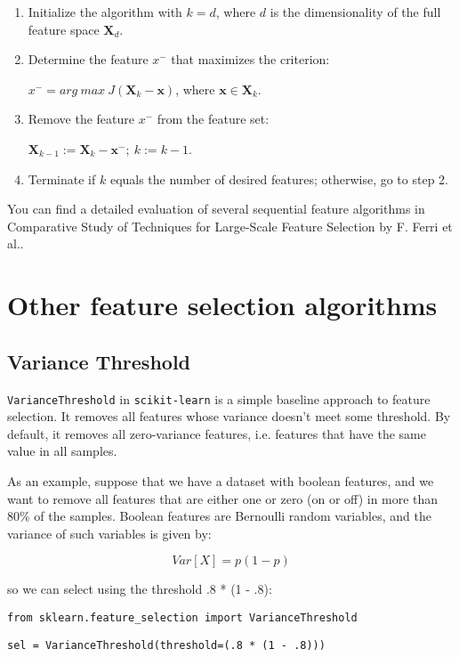 \documentclass[11pt]{article}
\begin{document}
    \begin{enumerate}
        \item Initialize the algorithm with $k=d$, where $d$ is the dimensionality of the full feature space $\boldsymbol{X}_d$.
        \item Determine the feature $x^-$ that maximizes the criterion:

        $x^-=arg~max~J(\boldsymbol{X}_k - \boldsymbol{x})$, where $\boldsymbol{x}\in \boldsymbol{X}_k$.

        \item Remove the feature $x^-$ from the feature set:

        $\boldsymbol{X}_{k-1}:=\boldsymbol{X}_k - \boldsymbol{x}^-;~k:=k-1$.

        \item Terminate if $k$ equals the number of desired features;
        otherwise, go to step 2.
    \end{enumerate}

    You can find a detailed evaluation of several sequential feature algorithms in Comparative Study of Techniques for Large-Scale Feature Selection by F. Ferri et al.\cite{Ferri1994}.

    \section{Other feature selection algorithms} \label{sec:other_feature_selection_algorithms}

    \subsection{Variance Threshold} \label{subsec:variance_threshold}

    \texttt{VarianceThreshold} in \texttt{scikit-learn} is a simple baseline approach to feature selection.
    It removes all features whose variance doesn’t meet some threshold.
    By default, it removes all zero-variance features, i.e. features that have the same value in all samples.

    As an example, suppose that we have a dataset with boolean features, and we want to remove all features that are either one or zero (on or off) in more than 80\% of the samples.
    Boolean features are Bernoulli random variables, and the variance of such variables is given by:

    \begin{equation} \label{eq:bernoulli_variance}
        Var[X] = p(1-p)
    \end{equation}

    so we can select using the threshold .8 * (1 - .8):

    \texttt{from sklearn.feature\_selection import VarianceThreshold}

    \texttt{sel = VarianceThreshold(threshold=(.8 * (1 - .8)))}


    
    
\end{document}
